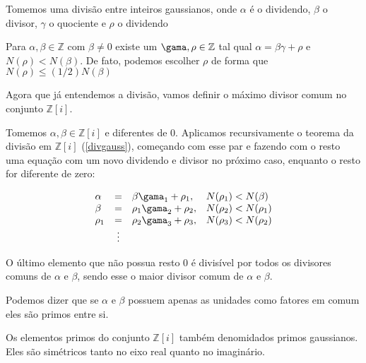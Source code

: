 Tomemos uma divis\~ao entre inteiros gaussianos, onde $\alpha$ \'e o dividendo, $\beta$ o divisor, $\gamma$ o quociente e $\rho$ o dividendo

\begin{Th}  \label{divgauss}

Para $\alpha, \beta \in \mathbb{Z}$ com $\beta \neq 0$ existe um $\gama, \rho \in \mathbb{Z}$ tal qual $\alpha = \beta \gamma + \rho$ e $N(\rho) < N(\beta)$. De fato, podemos escolher $\rho$  de forma que $N(\rho) \leq (1/2)N(\beta)$

\end{Th}

Agora que j\'a entendemos a divis\~ao, vamos definir o m\'aximo divisor comum no conjunto $\mathbb{Z}[i]$.

\begin{Th}
\label{euclideszi}

Tomemos $\alpha , \beta \in \mathbb{Z}[i]$ e diferentes de $0$. Aplicamos recursivamente o teorema da divis\~ao em $\mathbb{Z}[i]$ (\ref{divgauss}), come\c{c}ando com esse par e fazendo com o resto uma  equa\c{c}\~ao com um novo dividendo e divisor no pr\'oximo caso, enquanto o resto for diferente de zero:

\[
\begin{array}{lcll}
\alpha & = & \beta \gama_1 + \rho_1,  & N(\rho_1) < N(\beta)  \\
\beta  & = & \rho_1 \gama_2 + \rho_2, & N(\rho_2) < N(\rho_1) \\
\rho_1 & = & \rho_2 \gama_3 + \rho_3, & N(\rho_3) < N(\rho_2) \\
& \vdots &  &\\
\end{array}
\]

O \'ultimo elemento que n\~ao possua resto $0$ \'e divis\'ivel por todos os divisores comuns de $\alpha$ e $\beta$, sendo esse o maior divisor comum de $\alpha$ e $\beta$.

\end{Th}

Podemos dizer que se $\alpha$ e $\beta$ possuem apenas as unidades como fatores em comum eles s\~ao primos entre si. 


Os elementos primos do conjunto $\mathbb{Z}[i]$ tamb\'em denomidados primos gaussianos. Eles s\~ao sim\'etricos tanto no eixo real quanto no imagin\'ario. 

